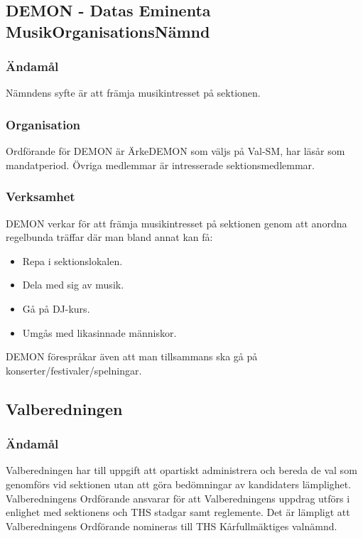 \documentclass{dgovdoc}
\begin{document}
\subsection{DEMON - Datas Eminenta MusikOrganisationsNämnd}

\subsubsection{Ändamål}

Nämndens syfte är att främja musikintresset på sektionen.

\subsubsection{Organisation}

Ordförande för DEMON är ÄrkeDEMON som väljs på Val-SM, har läsår som
mandatperiod. Övriga medlemmar är intresserade sektionsmedlemmar.

\subsubsection{Verksamhet}

DEMON verkar för att främja musikintresset på sektionen genom att anordna
regelbunda träffar där man bland annat kan få:

\begin{itemize}
\item Repa i sektionslokalen.
\item Dela med sig av musik.
\item Gå på DJ-kurs.
\item Umgås med likasinnade människor.
\end{itemize}

DEMON förespråkar även att man tillsammans ska gå på
konserter/festivaler/spelningar.

\subsection{Valberedningen}

\subsubsection{Ändamål}

Valberedningen har till uppgift att opartiskt administrera och bereda de
val som genomförs vid sektionen utan att göra bedömningar av kandidaters
lämplighet. Valberedningens Ordförande ansvarar för att Valberedningens
uppdrag utförs i enlighet med sektionens och THS stadgar samt reglemente.
Det är lämpligt att Valberedningens Ordförande nomineras till
THS Kårfullmäktiges valnämnd.
\end{document}
